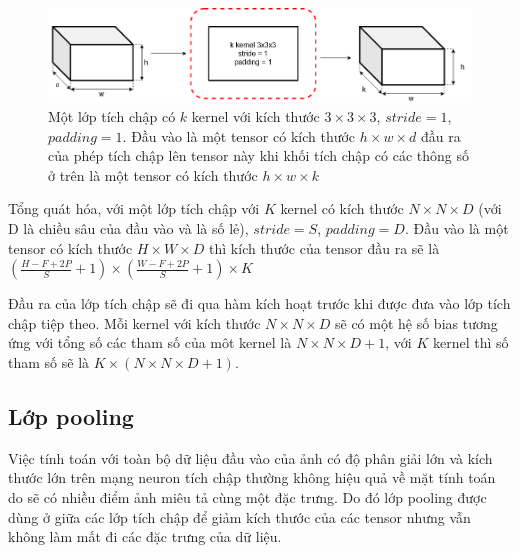 \begin{figure}[ht!]
	\centerline{\includegraphics[scale=0.4]{images/convol_layer_in_out.png}}
  	\caption{Một lớp tích chập có $k$ kernel với kích thước $3 \times 3 \times 3$, $stride = 1$, $padding = 1$. Đầu vào là một tensor có kích thước $h \times w \times d$ đầu ra của phép tích chập lên tensor này khi khối tích chập có các thông số ở trên là một tensor có kích thước $h \times w \times k$}
  	\label{fig:convol_layer_in_out}
\end{figure}
Tổng quát hóa, với một lớp tích chập với $K$ kernel có kích thước $N \times N \times D$ (với D là chiều sâu của đầu vào và là số lẻ), $stride=S$, $padding=D$. Đầu vào là một tensor có kích thước $H \times W \times D$ thì kích thước của tensor đầu ra sẽ là
$\left( 
	\frac
		{{H-F+2P}}
		{S}
	+1
\right)
\times
\left( 
	\frac
		{{W-F+2P}}
		{S}
	+1
\right)
\times
K$

Đầu ra của lớp tích chập sẽ đi qua hàm kích hoạt trước khi được đưa vào lớp tích chập tiệp theo. Mỗi kernel với kích thước $N \times N \times D$ sẽ có một hệ số bias tương ứng với tổng số các tham số của môt kernel là $N \times N \times D+1$, với $K$ kernel thì số tham số sẽ là $K \times (N \times N \times D+1)$.
\subsection{Lớp pooling}
Việc tính toán với toàn bộ dữ liệu đầu vào của ảnh có độ phân giải lớn và kích thước lớn trên mạng neuron tích chập thường không hiệu quả về mặt tính toán do sẽ có nhiều điểm ảnh miêu tả cùng một đặc trưng. Do đó lớp pooling được dùng ở giữa các lớp tích chập để giảm kích thước của các tensor nhưng vẫn không làm mất đi các đặc trưng của dữ liệu.

